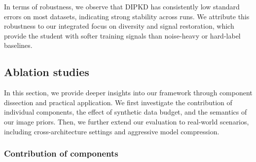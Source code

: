 \documentclass[12pt, a4paper, twoside]{book}
\numberwithin{equation}{chapter}
\theoremstyle{plain}
\theoremstyle{definition}
\theoremstyle{remark}
\newenvironment{foldable}{}{}
\begin{document}
\begin{foldable}
  In terms of robustness, we observe that \ac{DIPKD} has consistently low standard errors on most datasets, indicating strong stability across runs.
  We attribute this robustness to our integrated focus on diversity and signal restoration, which provide the student with softer training signals than noise-heavy or hard-label baselines.
\end{foldable}

\subsection{Ablation studies} \label{sec:44-research02-experiments-abla}
\begin{foldable}
  In this section, we provide deeper insights into our framework through component dissection and practical application.
  We first investigate the contribution of individual components, the effect of synthetic data budget, and the semantics of our image priors.
  Then, we further extend our evaluation to real-world scenarios, including cross-architecture settings and aggressive model compression.
\end{foldable}

\subsubsection{Contribution of components} \label{sec:44-research02-experiments-abla-components}
\end{document}

